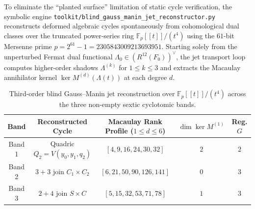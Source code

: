\documentclass[11pt,a4paper]{article}
\begin{document}
To eliminate the ``planted surface'' limitation of static cycle verification, the symbolic engine \texttt{toolkit/blind\_gauss\_manin\_jet\_reconstructor.py} reconstructs deformed algebraic cycles spontaneously from cohomological dual classes over the truncated power-series ring $\mathbb{F}_p[[t]]/(t^4)$ using the $61$-bit Mersenne prime $p = 2^{61} - 1 = 2305843009213693951$. Starting solely from the unperturbed Fermat dual functional $\Lambda_0 \in (R^{12}(F_0))^\vee$, the jet transport loop computes higher-order shadows $\Lambda^{(k)}$ for $1 \le k \le 3$ and extracts the Macaulay annihilator kernel $\ker M^{(d)}(\Lambda(t))$ at each degree $d$.

\begin{table}[htbp]
  \centering
  \footnotesize
  \setlength{\tabcolsep}{3pt}
  \caption{Third-order blind Gauss--Manin jet reconstruction over $\mathbb{F}_p[[t]]/(t^4)$ across the three non-empty sextic cyclotomic bands.}
  \label{tab:blind_gm_bands}
  \begin{tabular}{ccccc}
    \toprule
    Band & Reconstructed Cycle & Macaulay Rank Profile ($1 \le d \le 6$) & $\dim \ker M^{(1)}$ & Reg. $G$ \\
    \midrule
    Band 1 & Quadric $Q_2 = V(y_0, y_1, q_2)$ & $[4, 9, 16, 24, 30, 32]$ & $2$ & $2$ \\
    Band 2 & $3+3$ join $C_1 \times C_2$ & $[6, 21, 50, 90, 126, 141]$ & $0$ & $3$ \\
    Band 3 & $2+4$ join $S \times C$ & $[5, 15, 32, 53, 71, 78]$ & $1$ & $3$ \\
    \bottomrule
  \end{tabular}
\end{table}
\end{document}
